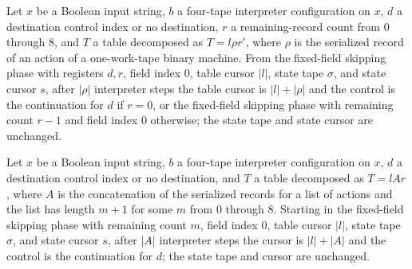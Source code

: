 \begin{lemma}
\label{Turing.universal_skip_record}
\leanok
{}
Let $x$ be a Boolean input string, $b$ a four-tape interpreter configuration on $x$, $d$
a destination control index or no destination, $r$ a remaining-record count from $0$
through $8$, and $T$ a table decomposed as $T=l\rho r'$, where $\rho$ is the serialized
record of an action of a one-work-tape binary machine. From the fixed-field skipping
phase with registers $d,r$, field index $0$, table cursor $|l|$, state tape $\sigma$,
and state cursor $s$, after $|\rho|$ interpreter steps the table cursor is $|l|+|\rho|$
and the control is the continuation for $d$ if $r=0$, or the fixed-field skipping phase
with remaining count $r-1$ and field index $0$ otherwise; the state tape and state
cursor are unchanged.
\end{lemma}

\begin{lemma}
\label{Turing.universal_skip_records}
\leanok
{}
Let $x$ be a Boolean input string, $b$ a four-tape interpreter configuration on $x$, $d$
a destination control index or no destination, and $T$ a table decomposed as $T=lAr$,
where $A$ is the concatenation of the serialized records for a list of actions and the
list has length $m+1$ for some $m$ from $0$ through $8$. Starting in the fixed-field
skipping phase with remaining count $m$, field index $0$, table cursor $|l|$, state tape
$\sigma$, and state cursor $s$, after $|A|$ interpreter steps the cursor is $|l|+|A|$
and the control is the continuation for $d$; the state tape and cursor are unchanged.
\end{lemma}

